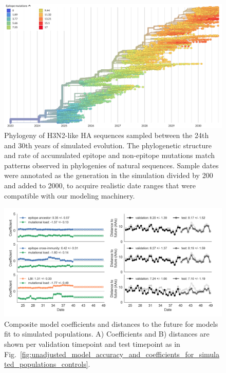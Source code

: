 \begin{figure}[H]
  \begin{center}
  \includegraphics[width=\textwidth]{figures/simulated-h3n2-ha-phylogeny.png}
  \caption{
  Phylogeny of H3N2-like HA sequences sampled between the 24th and 30th years of simulated evolution.
  The phylogenetic structure and rate of accumulated epitope and non-epitope mutations match patterns observed in phylogenies of natural sequences.
  Sample dates were annotated as the generation in the simulation divided by 200 and added to 2000, to acquire realistic date ranges that were compatible with our modeling machinery.
  }
  \label{sup_fig:simulated_h3n2_ha_phylogeny}
  \end{center}
\end{figure}

\begin{figure}[H]
  \begin{center}
  \includegraphics[width=\textwidth]{figures/unadjusted-composite-model-accuracy-and-coefficients-for-simulated-populations.png}
  \caption{
  Composite model coefficients and distances to the future for models fit to simulated populations.
  A) Coefficients and B) distances are shown per validation timepoint and test timepoint as in Fig.~\ref{fig:unadjusted_model_accuracy_and_coefficients_for_simulated_populations_controls}.
  }
  \label{sup_fig:unadjusted_composite_model_accuracy_and_coefficients_for_simulated_populations}
  \end{center}
\end{figure}

